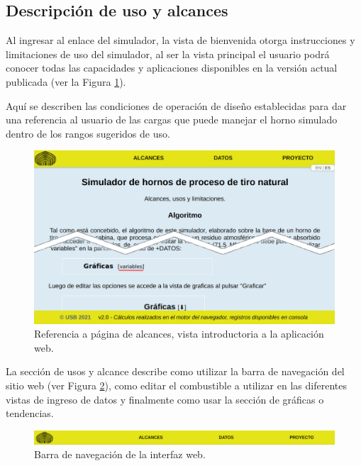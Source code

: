 \subsection{Descripción de uso y alcances}
\par Al ingresar al enlace del simulador, la vista de bienvenida otorga instrucciones y limitaciones de uso del simulador, al ser la vista principal el usuario podrá conocer todas las capacidades y aplicaciones disponibles en la versión actual publicada (ver la Figura \ref{fig:alcance}).
\par Aquí se describen las condiciones de operación de diseño establecidas para dar una referencia al usuario de las cargas que puede manejar el horno simulado dentro de los rangos sugeridos de uso.
\begin{figure}[H]
\begin{center}
\includegraphics[scale=0.33]{images/alcance}
\caption[Página de alcances]{Referencia a página de alcances, vista introductoria a la aplicación web.}
\label{fig:alcance}
\end{center}
\end{figure}
\par La sección de usos y alcance describe como utilizar la barra de navegación del sitio web (ver Figura \ref{fig:navbar}), como editar el combustible a utilizar en las diferentes vistas de ingreso de datos y finalmente como usar la sección de gráficas o tendencias.
\begin{figure}[H]
\begin{center}
\includegraphics[scale=0.22]{images/navbar}
\caption[Barra de navegación]{Barra de navegación de la interfaz web.}
\label{fig:navbar}
\end{center}
\end{figure}

